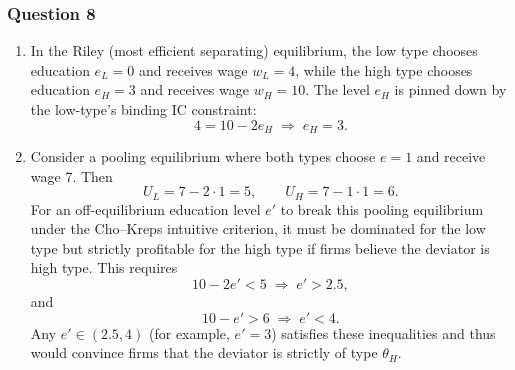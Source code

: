 \documentclass[12pt,a4paper]{article}
\begin{document}
\subsubsection*{Question 8}

\begin{enumerate}
  \item In the Riley (most efficient separating) equilibrium, the low type chooses education \(e_L = 0\) and receives wage \(w_L = 4\), while the high type chooses education \(e_H = 3\) and receives wage \(w_H = 10\). The level \(e_H\) is pinned down by the low-type's binding IC constraint:
        \[
          4 = 10 - 2e_H \;\Longrightarrow\; e_H = 3.
        \]

  \item Consider a pooling equilibrium where both types choose \(e=1\) and receive wage 7. Then
        \[
          U_L = 7 - 2\cdot 1 = 5, \qquad U_H = 7 - 1\cdot 1 = 6.
        \]
        For an off-equilibrium education level \(e'\) to break this pooling equilibrium under the Cho--Kreps intuitive criterion, it must be dominated for the low type but strictly profitable for the high type if firms believe the deviator is high type. This requires
        \[
          10 - 2e' < 5 \;\Longrightarrow\; e' > 2.5,
        \]
        and
        \[
          10 - e' > 6 \;\Longrightarrow\; e' < 4.
        \]
        Any \(e' \in (2.5, 4)\) (for example, \(e'=3\)) satisfies these inequalities and thus would convince firms that the deviator is strictly of type \(\theta_H\).
\end{enumerate}
\end{document}
